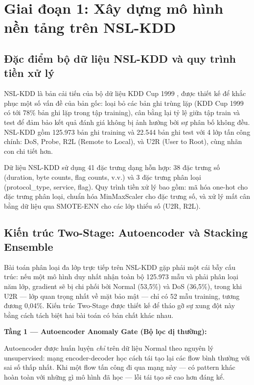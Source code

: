 \documentclass[../DoAn.tex]{subfiles}
\begin{document}
\section{Giai đoạn 1: Xây dựng mô hình nền tảng trên NSL-KDD}
\label{sec:gd1}

\subsection{Đặc điểm bộ dữ liệu NSL-KDD và quy trình tiền xử lý}
\label{subsec:gd1-data}

NSL-KDD \cite{tavallaee2009} là bản cải tiến của bộ dữ liệu KDD Cup 1999 \cite{kdd99}, được thiết kế để khắc phục một số vấn đề của bản gốc: loại bỏ các bản ghi trùng lặp (KDD Cup 1999 có tới 78\% bản ghi lặp trong tập training), cân bằng lại tỷ lệ giữa tập train và test để đảm bảo kết quả đánh giá không bị ảnh hưởng bởi sự phân bố không đều. NSL-KDD gồm 125.973 bản ghi training và 22.544 bản ghi test với 4 lớp tấn công chính: DoS, Probe, R2L (Remote to Local), và U2R (User to Root), cùng nhãn con chi tiết hơn.

Dữ liệu NSL-KDD sử dụng 41 đặc trưng dạng hỗn hợp: 38 đặc trưng số (duration, byte counts, flag counts, v.v.) và 3 đặc trưng phân loại (protocol\_type, service, flag). Quy trình tiền xử lý bao gồm: mã hóa one-hot cho đặc trưng phân loại, chuẩn hóa MinMaxScaler cho đặc trưng số, và xử lý mất cân bằng dữ liệu qua SMOTE-ENN cho các lớp thiểu số (U2R, R2L).

\subsection{Kiến trúc Two-Stage: Autoencoder và Stacking Ensemble}
\label{subsec:gd1-arch}

Bài toán phân loại đa lớp trực tiếp trên NSL-KDD gặp phải một cái bẫy cấu trúc: nếu một mô hình duy nhất nhận toàn bộ 125.973 mẫu và phải phân loại năm lớp, gradient sẽ bị chi phối bởi Normal (53,5\%) và DoS (36,5\%), trong khi U2R --- lớp quan trọng nhất về mặt bảo mật --- chỉ có 52 mẫu training, tương đương 0,04\%. Kiến trúc Two-Stage được thiết kế để tháo gỡ sự xung đột này bằng cách tách biệt hai bài toán có bản chất khác nhau.

\textbf{Tầng 1 --- Autoencoder Anomaly Gate (Bộ lọc dị thường):}

Autoencoder được huấn luyện \textit{chỉ} trên dữ liệu Normal theo nguyên lý unsupervised: mạng encoder-decoder học cách tái tạo lại các flow bình thường với sai số thấp nhất. Khi một flow tấn công đi qua mạng này --- có pattern khác hoàn toàn với những gì mô hình đã học --- lỗi tái tạo sẽ cao hơn đáng kể.
\end{document}
